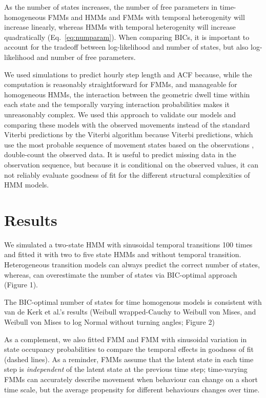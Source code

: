 \documentclass{bmcart}
\begin{document}
As the number of states increases, the number of free parameters in time-homogeneous FMMs and HMMs and FMMs with temporal heterogenity will increase linearly, whereas HMMs with temporal heterogenity will increase quadratically (Eq.~\ref{eq:numparam}). When comparing BICs, it is important to account for the tradeoff between log-likelihood and number of states, but also log-likelihood and number of free parameters.

We used simulations to predict hourly step length and ACF 
because, while the computation is reasonably straightforward for FMMs, and manageable for homogeneous HMMs, the interaction between the geometric dwell time within each state and the temporally varying interaction probabilities makes it unreasonably complex. 
We used this approach to validate our models and comparing these models with the observed movements instead of the standard Viterbi predictions by the Viterbi algorithm because Viterbi predictions, which use the most probable sequence of movement states based on the observations \cite{zucchini_hidden_2009,langrock_flexible_2012}, double-count the observed data. It is useful to predict missing data in the observation sequence, but because it is conditional on the observed values, it can not reliably evaluate goodness of fit for the different structural complexities of HMM models.

\section*{Results}


We simulated a two-state HMM with sinusoidal temporal transitions 100 times and fitted it with two to five state HMMs and without temporal transition. Heterogeneous transition models can always predict the correct number of states, whereas, can overestimate the number of states via BIC-optimal approach (Figure 1). 


The BIC-optimal number of states for time homogenous models is consistent with van de Kerk et al.'s \cite{kerk2015hidden} results (Weibull wrapped-Cauchy to Weibull von Mises, and Weibull von Mises to log Normal without turning angles; Figure 2) 

As a complement, we also fitted FMM and FMM with sinusoidal variation in state occupancy probabilities to compare the temporal effects in goodness of fit (dashed lines).
As a reminder, FMMs assume that the latent state in each time step is 
\emph{independent} of the latent state at the previous time step; 
time-varying FMMs can accurately describe movement when behaviour can
change on a short time scale, but the average propensity for different
behaviours changes over time.
\end{document}
